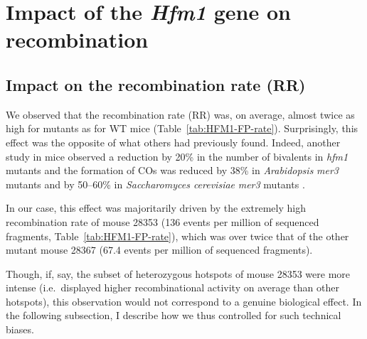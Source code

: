 \clearpage





\section{Impact of the \textit{Hfm1} gene on recombination}
\subsection{Impact on the recombination rate (RR)}
\label{chap8:recombination-rate}

We observed that the recombination rate (RR) was, on average, almost twice as high for mutants as for WT mice (Table~\ref{tab:HFM1-FP-rate}).
Surprisingly, this effect was the opposite of what others had previously found.
Indeed, another study in mice observed a reduction by 20\% in the number of bivalents in \textit{hfm1} mutants \citep{guiraldelli2013mouse} and the formation of COs was reduced by 38\% in \textit{Arabidopsis} \textit{mer3} mutants \citep{mercier2005two} and by 50--60\% in \textit{Saccharomyces cerevisiae} \textit{mer3} mutants \citep{borner2004crossover,jessop2006meiotic}.

In our case, this effect was majoritarily driven by the extremely high recombination rate of mouse 28353 (136 events per million of sequenced fragments, Table~\ref{tab:HFM1-FP-rate}), which was over twice that of the other mutant mouse 28367 (67.4 events per million of sequenced fragments).

Though, if, say, the subset of heterozygous hotspots of mouse 28353 were more intense (i.e.\ displayed higher recombinational activity on average than other hotspots), this observation would not correspond to a genuine biological effect.
In the following subsection, I describe how we thus controlled for such technical biases.



